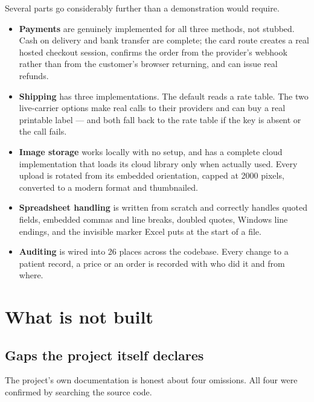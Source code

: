 \documentclass[11pt,a4paper]{report}
\begin{document}
Several parts go considerably further than a demonstration would require.

\begin{itemize}
  \item \textbf{Payments} are genuinely implemented for all three methods, not
        stubbed. Cash on delivery and bank transfer are complete; the card
        route creates a real hosted checkout session, confirms the order from
        the provider's webhook rather than from the customer's browser
        returning, and can issue real refunds.
  \item \textbf{Shipping} has three implementations. The default reads a rate
        table. The two live-carrier options make real calls to their
        providers and can buy a real printable label --- and both fall back to
        the rate table if the key is absent or the call fails.
  \item \textbf{Image storage} works locally with no setup, and has a complete
        cloud implementation that loads its cloud library only when actually
        used. Every upload is rotated from its embedded orientation, capped at
        2000 pixels, converted to a modern format and thumbnailed.
  \item \textbf{Spreadsheet handling} is written from scratch and correctly
        handles quoted fields, embedded commas and line breaks, doubled
        quotes, Windows line endings, and the invisible marker Excel puts at
        the start of a file.
  \item \textbf{Auditing} is wired into 26 places across the codebase. Every
        change to a patient record, a price or an order is recorded with who
        did it and from where.
\end{itemize}

\chapter{What is not built}

\section{Gaps the project itself declares}

The project's own documentation is honest about four omissions. All four were
confirmed by searching the source code.
\end{document}
